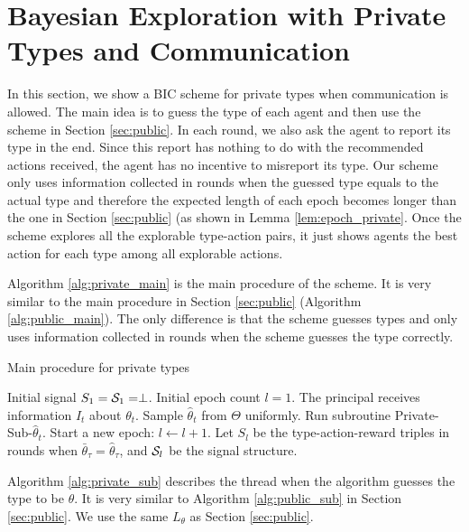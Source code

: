 
\section{Bayesian Exploration with Private Types and Communication}
\label{sec:private}
In this section, we show a BIC scheme for private types when communication is allowed. The main idea is to guess the type of each agent and then use the scheme in Section \ref{sec:public}. In each round, we also ask the agent to report its type in the end. Since this report has nothing to do with the recommended actions received, the agent has no incentive to misreport its type. Our scheme only uses information collected in rounds when the guessed type equals to the actual type and therefore the expected length of each epoch becomes longer than the one in Section \ref{sec:public} (as shown in Lemma \ref{lem:epoch_private}. Once the scheme explores all the explorable type-action pairs, it just shows agents the best action for each type among all explorable actions. 

Algorithm \ref{alg:private_main} is the main procedure of the scheme. It is very similar to the main procedure in Section \ref{sec:public} (Algorithm \ref{alg:public_main}). The only difference is that the scheme guesses types and only uses information collected in rounds when the scheme guesses the type correctly. 

 \begin{algorithm}[H]
    \caption{Main procedure for private types }
    	\label{alg:private_main}
    \begin{algorithmic}[1]
    	\STATE Initial signal $S_1 = \S_1 = \perp$.
	\STATE Initial epoch count $l = 1$. 
		\STATE The principal receives information $I_t$ about $\theta_t$. 
		\STATE Sample $\hat{\theta}_t$ from $\varTheta$ uniformly. Run subroutine Private-Sub-$\hat{\theta}_t$.
			\STATE Start a new epoch:
			\STATE $l \leftarrow l + 1$.
			\STATE Let $S_l$ be the type-action-reward triples in rounds when $\bar{\theta}_{\tau} = \hat{\theta}_{\tau}$, and $\S_l$ be the signal structure.
		\ENDIF
	\ENDFOR
     \end{algorithmic}
\end{algorithm}

Algorithm \ref{alg:private_sub} describes the thread when the algorithm guesses the type to be $\theta$. It is very similar to Algorithm \ref{alg:public_sub} in Section \ref{sec:public}. We use the same $L_{\theta}$ as Section \ref{sec:public}.

